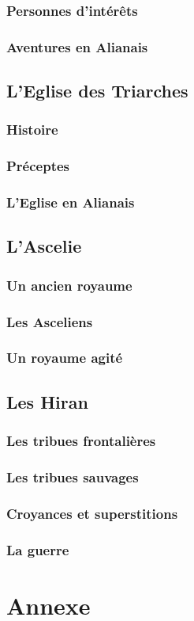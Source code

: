 \documentclass[10pt,a4paper,twocolumn]{book}
\begin{document}
\subsection{Personnes d'intérêts}
\subsection{Aventures en Alianais}
\section{L'Eglise des Triarches}
\subsection{Histoire}
\subsection{Préceptes}
\subsection{L'Eglise en Alianais}
\section{L'Ascelie}
\subsection{Un ancien royaume}
\subsection{Les Asceliens}
\subsection{Un royaume agité}

\section{Les Hiran}
\subsection{Les tribues frontalières}
\subsection{Les tribues sauvages}
\subsection{Croyances et superstitions}
\subsection{La guerre}
\chapter*{Annexe}
\tableofcontents
\end{document}

